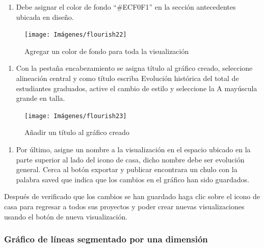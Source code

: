 \documentclass[
]{book}
\providecommand{\tightlist}{%
  \setlength{\itemsep}{0pt}\setlength{\parskip}{0pt}}
\begin{document}
\begin{enumerate}
\def\labelenumi{\arabic{enumi}.}
\setcounter{enumi}{13}
\tightlist
\item
  Debe asignar el color de fondo ``\#ECF0F1'' en la sección antecedentes ubicada en diseño.
\end{enumerate}

\begin{figure}

{\centering \texttt{[image: Imágenes/flourish22]} 

}

\caption{Agregar un color de fondo para toda la visualización}\label{fig:colordefondoflourish-fig}
\end{figure}

\begin{enumerate}
\def\labelenumi{\arabic{enumi}.}
\setcounter{enumi}{14}
\tightlist
\item
  Con la pestaña encabezamiento se asigna título al gráfico creado, seleccione alineación central y como título escriba Evolución histórica del total de estudiantes graduados, active el cambio de estilo y seleccione la A mayúscula grande en talla.
\end{enumerate}

\begin{figure}

{\centering \texttt{[image: Imágenes/flourish23]} 

}

\caption{Añadir un título al gráfico creado}\label{fig:titulodelgraficoflourish-fig}
\end{figure}

\begin{enumerate}
\def\labelenumi{\arabic{enumi}.}
\setcounter{enumi}{15}
\tightlist
\item
  Por último, asigne un nombre a la visualización en el espacio ubicado en la parte superior al lado del icono de casa, dicho nombre debe ser evolución general. Cerca al botón exportar y publicar encontrara un chulo con la palabra saved que indica que los cambios en el gráfico han sido guardados.
\end{enumerate}

Después de verificado que los cambios se han guardado haga clic sobre el icono de casa para regresar a todos sus proyectos y poder crear nuevas visualizaciones usando el botón de nueva visualización.

\hypertarget{graficolineassegmentadoflourish}{%
\subsubsection{Gráfico de líneas segmentado por una dimensión}\label{graficolineassegmentadoflourish}}
\end{document}

